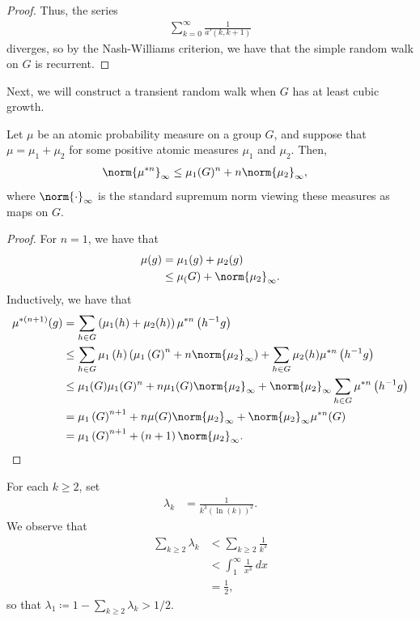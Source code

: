 \documentclass[10pt]{mypackage}
\renewcommand{\coloneq}{\coloneqq}
\begin{document}
\begin{proof}
  Thus, the series
  \begin{align*}
    \sum_{k=0}^{\infty} \frac{1}{a'\left( k,k+1 \right)}
  \end{align*}
  diverges, so by the Nash-Williams criterion, we have that the simple random walk on $G$ is recurrent.
\end{proof}
Next, we will construct a transient random walk when $G$ has at least cubic growth.
\begin{lemma}
  Let $\mu$ be an atomic probability measure on a group $G$, and suppose that $\mu = \mu_1 + \mu_2$ for some positive atomic measures $\mu_1$ and $\mu_2$. Then,
  \begin{align*}
    \norm{\mu^{\ast n}}_{\infty} &\leq \mu_1(G)^{n} + n\norm{\mu_2}_{\infty},
  \end{align*}
  where $\norm{\cdot}_{\infty}$ is the standard supremum norm viewing these measures as maps on $G$.
\end{lemma}
\begin{proof}
  For $n=1$, we have that
  \begin{align*}
    \mu(g) &= \mu_1(g) + \mu_2(g)\\
           &\leq \mu_(G) + \norm{\mu_2}_{\infty}.
  \end{align*}
  Inductively, we have that
  \begin{align*}
    \mu^{\ast\left( n+1 \right)}(g) &= \sum_{h\in G} \left( \mu_1(h) + \mu_2(h) \right)\mu^{\ast n}\left( h^{-1}g \right)\\
                                    &\leq \sum_{h\in G} \mu_1\left( h \right)\left( \mu_1\left( G \right)^{n} + n\norm{\mu_2}_{\infty} \right) + \sum_{h\in G}\mu_2(h)\mu^{\ast n}\left( h^{-1}g \right)\\
                                    &\leq \mu_1(G)\mu_1(G)^{n} + n\mu_1(G)\norm{\mu_2}_{\infty} + \norm{\mu_2}_{\infty}\sum_{h\in G}\mu^{\ast n}\left( h^{-1}g \right)\\
                                    &= \mu_1\left( G \right)^{n+1} + n\mu(G)\norm{\mu_2}_{\infty} + \norm{\mu_2}_{\infty}\mu^{\ast n}(G)\\
                                    &= \mu_1\left( G \right)^{n+1} + \left( n+1 \right)\norm{\mu_2}_{\infty}.
  \end{align*}
\end{proof}
For each $k\geq 2$, set
\begin{align*}
  \lambda_k &= \frac{1}{k^3 \left( \ln(k) \right)^2}.
\end{align*}
We observe that
\begin{align*}
  \sum_{k\geq 2}\lambda_k &< \sum_{k\geq 2} \frac{1}{k^3}\\
                          &< \int_{1}^{\infty} \frac{1}{x^3}\:dx\\
                          &= \frac{1}{2},
\end{align*}
so that $\lambda_1 \coloneq 1-\sum_{k\geq 2}\lambda_k > 1/2$. 
\end{document}
